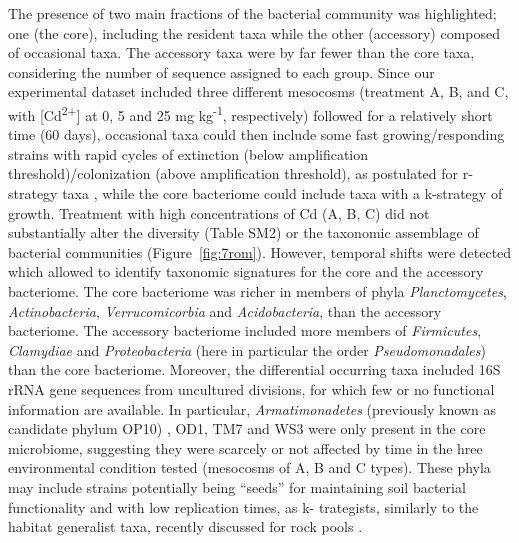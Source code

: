 The presence of two main fractions of the bacterial community was highlighted; one (the core), including the resident taxa while the other (accessory) composed of occasional taxa. The accessory taxa were by far fewer than the core taxa, considering the number of sequence assigned to each group. Since our experimental dataset included three different mesocosms (treatment A, B, and C, with [Cd\textsuperscript{2+}] at 0, 5 and 25 mg kg\textsuperscript{-1}, respectively) followed for a relatively short time (60 days), occasional taxa could then include some fast growing/responding strains with rapid cycles of extinction (below amplification threshold)/colonization (above amplification threshold), as postulated for r-strategy taxa \cite{safriel1980criteria}, while the core bacteriome could include taxa with a k-strategy of growth. Treatment with high concentrations of Cd (A, B, C) did not substantially alter the diversity (Table SM2) or the taxonomic assemblage of bacterial communities (Figure~\ref{fig:7rom}). However, temporal shifts were detected which allowed to identify taxonomic signatures for the core and the accessory bacteriome. The core bacteriome was richer in members of phyla \textit{Planctomycetes}, \textit{Actinobacteria}, \textit{Verrucomicorbia} and \textit{Acidobacteria}, than the accessory bacteriome. The accessory bacteriome included more members of \textit{Firmicutes}, \textit{Clamydiae} and \textit{Proteobacteria } (here in particular the order \textit{Pseudomonadales}) than the core bacteriome. Moreover, the differential occurring taxa included 16S rRNA gene sequences from uncultured divisions, for which few or no functional information are available. In particular, \textit{Armatimonadetes} (previously known as candidate phylum OP10) \cite{tamaki2010armatimonas}, OD1, TM7 and WS3 were only present in the core microbiome, suggesting they were scarcely or not affected by time in the hree environmental condition tested (mesocosms of A, B and C types). These phyla may include strains potentially being ``seeds'' for maintaining soil bacterial functionality and with low replication times, as k- trategists, similarly to the habitat generalist taxa, recently discussed for rock pools \cite{szekely2014importance}.\\
